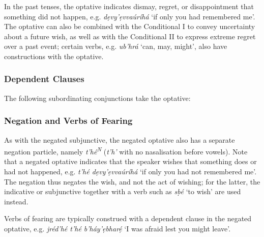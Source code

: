 \documentclass[a4paper, 12pt, twoside, final]{article}
\newlength{\EnumItemSep} \EnumItemSep-3pt
\newenvironment { dlist } [1] [{}] {
    \vspace { -.5em }
    \begingroup
    \def\descriptionlabel ##1 {\hspace\labelsep \normalfont #1 ##1}
    \settowidth \leftmargini { 99.\hskip\labelsep }
    \begin { description }
    \itemsep \EnumItemSep
} {
    \end { description }
    \endgroup
    \vspace { -.5em }
}
\def \N {\textsuperscript{N}}
\let \w \textit
\begin{document}
In the past tenses, the optative indicates dismay, regret, or disappointment that something did not happen, e.g.
 \w{dẹvy’ẹvvaúríhá} ‘if only you had remembered me’. The optative can also be combined with the Conditional I
to convey uncertainty about a future wish, as well as with the Conditional II to express extreme regret over a past event;
certain verbs, e.g. \w{ub’hrá} ‘can, may, might’, also have constructions with the optative.

\subsubsection{Dependent Clauses}
The following subordinating conjunctions take the optative:

\subsubsection{Negation and Verbs of Fearing}\label{subsubsec:negated-optative}
As with the negated subjunctive, the negated optative also has a separate negation particle, namely \w{t’hé\N{}}
(\w{t’h’} with no nasalisation before vowels). Note that a negated optative indicates that the speaker wishes that something does
or had not happened, e.g. \w{t’hé dẹvy’ẹvvaúríhá} ‘if only you had not remembered me’. The negation thus negates
the wish, and not the act of wishing; for the latter, the indicative or subjunctive together with a verb such
as \w{sḅé} ‘to wish’ are used instead.

Verbs of fearing are typically construed with a dependent clause in the negated optative, e.g. \w{jréd’hé
t’hé b’háy’ẹbharẹ́} ‘I was afraid lest you might leave’.
\end{document}
